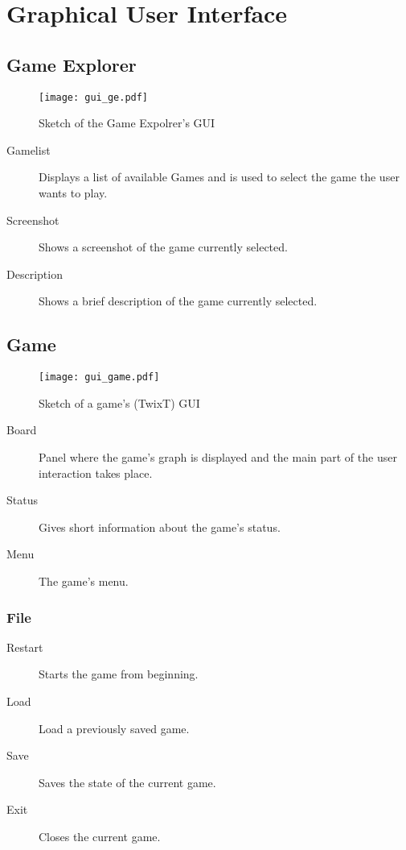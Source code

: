 \section{Graphical User Interface}
\subsection{Game Explorer}

\begin{figure}[h]
	\centering
	\texttt{[image: gui\_ge.pdf]}
	\caption{Sketch of the Game Expolrer's GUI}
	\label{img:GE_GUI}
\end{figure}

\begin{description}
	\item[Gamelist] Displays a list of available Games and is used to select the game the user wants to play.
	\item[Screenshot] Shows a screenshot of the game currently selected.
	\item[Description] Shows a brief description of the game currently selected.
\end{description}

\subsection{Game} \label{REF:GUI_GAME}

\begin{figure}[H]
	\centering
	\texttt{[image: gui\_game.pdf]}
	\caption{Sketch of a game's (TwixT) GUI}
	\label{img:GAME_GUI}
\end{figure}

\begin{description}
	\item[Board] Panel where the game's graph is displayed and the main part of the user interaction takes place.
	\item[Status] Gives short information about the game's status.
	\item[Menu] The game's menu.
\end{description}

\subsubsection{File}
\begin{description}
	\item[Restart] Starts the game from beginning.
	\item[Load] Load a previously saved game.
	\item[Save] Saves the state of the current game.
	\item[Exit] Closes the current game.
\end{description}
